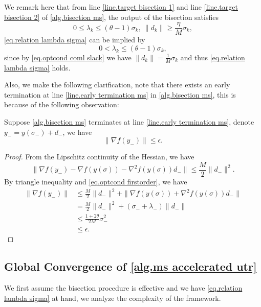 \documentclass{article}
\begin{document}
We remark here that from line \ref{line.target bisection 1} and line \ref{line.target bisection 2} of \autoref{alg.bisection ms}, the output of the bisection satisfies 
\begin{equation}
    \label{eq.relation lambda sigma}
        0\leq \lambda_k\leq (\theta-1)\sigma_k, \ \|d_k\| \geq \frac{\eta}{M}\sigma_k,
\end{equation}
\eqref{eq.relation lambda sigma} can be implied by 
\begin{equation}
    \label{eq.stonger relation lambda sigma}
    0< \lambda_k \leq (\theta-1)\sigma_k,
\end{equation}
since by \eqref{eq.optcond coml slack} we have $\|d_k\| =\frac{1}{M}\sigma_k$ and thus \eqref{eq.relation lambda sigma} holds. 

Also, we make the following clarification, note that there exists an early termination at line \ref{line.early termination ms} in \autoref{alg.bisection ms}, this is because of the following observation:
\begin{lemma}
    \label{lem.early termination ms}
    Suppose \autoref{alg.bisection ms} terminates at line \ref{line.early termination ms}, denote $y_- = y(\sigma_-)+d_-$, we have
    \begin{equation*}
        \|\nabla f(y_-) \|\leq \epsilon.
    \end{equation*}
\end{lemma}
\begin{proof}
    From the Lipschitz continuity of the Hessian, we have
    \begin{equation*}
        \|\nabla f(y_-)-\nabla f(y(\sigma))-\nabla^2 f(y(\sigma))d_-\|\leq \frac{M}{2}\|d_-\|^2.
    \end{equation*}
    By triangle inequality and \eqref{eq.optcond firstorder}, we have
    \begin{equation*}
        \begin{aligned}
            \|\nabla f(y_-)\| &\leq \frac{M}{2}\|d_-\|^2+\| \nabla f(y(\sigma))+\nabla^2 f(y(\sigma))d_-\|\\ 
            &= \frac{M}{2}\|d_-\|^2+(\sigma_-+\lambda_-) \|d_-\|\\
            &\leq \frac{1+2\theta}{2M}\sigma_-^2\\
            &\leq \epsilon.
        \end{aligned}
    \end{equation*}
\end{proof}
\subsection{Global Convergence of \autoref{alg.ms accelerated utr}}
We first assume the bisection procedure is effective and we have \eqref{eq.relation lambda sigma} at hand, we analyze the complexity of the framework.
\end{document}

